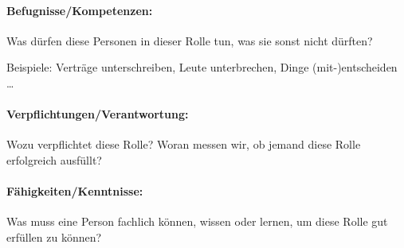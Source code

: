 \paragraph{Befugnisse/Kompetenzen:} Was dürfen diese Personen in dieser Rolle tun, was sie sonst nicht dürften?

Beispiele: Verträge unterschreiben, Leute unterbrechen, Dinge (mit-)entscheiden \ldots

\paragraph{Verpflichtungen/Verantwortung:} Wozu verpflichtet diese Rolle? Woran messen wir, ob jemand diese Rolle erfolgreich ausfüllt?

\paragraph{Fähigkeiten/Kenntnisse:} Was muss eine Person fachlich können, wissen oder lernen, um diese Rolle gut erfüllen zu können?
